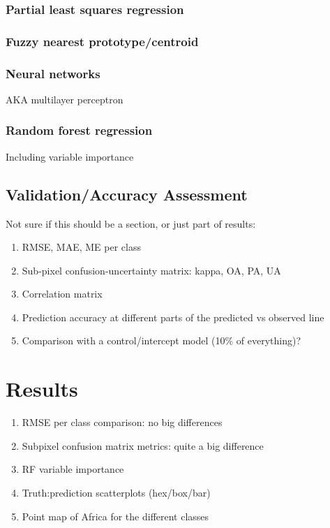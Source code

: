 \documentclass[a4paper,10pt]{article}
\begin{document}
\subsubsection{Partial least squares regression}

\subsubsection{Fuzzy nearest prototype/centroid}

\subsubsection{Neural networks}

AKA multilayer perceptron

\subsubsection{Random forest regression}

Including variable importance

\subsection{Validation/Accuracy Assessment}

Not sure if this should be a section, or just part of results:

\begin{enumerate}
 \item RMSE, MAE, ME per class
 \item Sub-pixel confusion-uncertainty matrix: kappa, OA, PA, UA
 \item Correlation matrix
 \item Prediction accuracy at different parts of the predicted vs observed line
 \item Comparison with a control/intercept model (10\% of everything)?
\end{enumerate}

\section{Results}

\begin{enumerate}
 \item RMSE per class comparison: no big differences
 \item Subpixel confusion matrix metrics: quite a big difference
 \item RF variable importance
 \item Truth:prediction scatterplots (hex/box/bar)
 \item Point map of Africa for the different classes
\end{enumerate}
\end{document}
